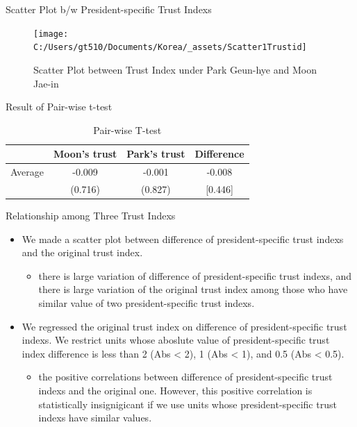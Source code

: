 \documentclass[
  ignorenonframetext,
]{beamer}
\providecommand{\tightlist}{%
  \setlength{\itemsep}{0pt}\setlength{\parskip}{0pt}}
\begin{document}
\begin{frame}{Scatter Plot b/w President-specific Trust Indexs}
\protect\hypertarget{scatter-plot-bw-president-specific-trust-indexs}{}

\begin{figure}
\texttt{[image: C:/Users/gt510/Documents/Korea/\_assets/Scatter1Trustid]} \caption{Scatter Plot between Trust Index under Park Geun-hye and Moon Jae-in}\label{fig:unnamed-chunk-6}
\end{figure}

\end{frame}

\begin{frame}{Result of Pair-wise t-test}
\protect\hypertarget{result-of-pair-wise-t-test}{}

\begin{table}

\caption{\label{tab:kableTtestPresidentTrustid}Pair-wise T-test}
\centering
\begin{tabular}[t]{lccc}
\toprule
 & Moon's trust & Park's trust & Difference\\
\midrule
Average & -0.009 & -0.001 & -0.008\\
 & (0.716) & (0.827) & [0.446]\\
\bottomrule
\end{tabular}
\end{table}

\end{frame}

\begin{frame}{Relationship among Three Trust Indexs}
\protect\hypertarget{relationship-among-three-trust-indexs}{}

\begin{itemize}
\tightlist
\item
  We made a scatter plot between difference of president-specific trust
  indexs and the original trust index.

  \begin{itemize}
  \tightlist
  \item
    there is large variation of difference of president-specific trust
    indexs, and there is large variation of the original trust index
    among those who have similar value of two president-specific trust
    indexs.
  \end{itemize}
\item
  We regressed the original trust index on difference of
  president-specific trust indexs. We restrict units whose aboslute
  value of president-specific trust index difference is less than 2 (Abs
  \textless{} 2), 1 (Abs \textless{} 1), and 0.5 (Abs \textless{} 0.5).

  \begin{itemize}
  \tightlist
  \item
    the positive correlations between difference of president-specific
    trust indexs and the original one. However, this positive
    correlation is statistically insignigicant if we use units whose
    president-specific trust indexs have similar values.
  \end{itemize}
\end{itemize}

\end{frame}
\end{document}
